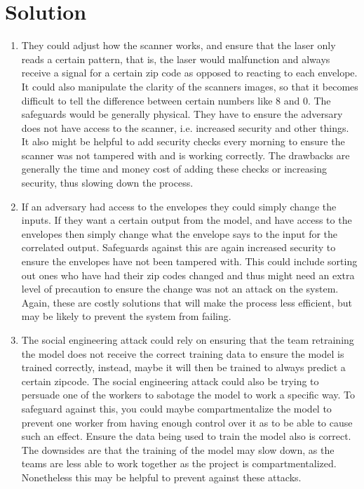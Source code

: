 \documentclass[submit]{harvardml}
\newenvironment{answer}
  {\section*{Solution}}
{}
\begin{document}
\begin{answer}
\begin{enumerate}
      \begin{enumerate}
        \item They could adjust how the scanner works, and ensure that the laser only reads a certain pattern, that is, the laser would malfunction and always receive a signal for a certain zip code as opposed to reacting to each envelope. It could also manipulate the clarity of the scanners images, so that it becomes difficult to tell the difference between certain numbers like 8 and 0. The safeguards would be generally physical. They have to ensure the adversary does not have access to the scanner, i.e. increased security and other things. It also might be helpful to add security checks every morning to ensure the scanner was not tampered with and is working correctly. The drawbacks are generally the time and money cost of adding these checks or increasing security, thus slowing down the process. 
        \item If an adversary had access to the envelopes they could simply change the inputs. If they want a certain output from the model, and have access to the envelopes then simply change what the envelope says to the input for the correlated output. Safeguards against this are again increased security to ensure the envelopes have not been tampered with. This could include sorting out ones who have had their zip codes changed and thus might need an extra level of precaution to ensure the change was not an attack on the system. Again, these are costly solutions that will make the process less efficient, but may be likely to prevent the system from failing. 
        \item The social engineering attack could rely on ensuring that the team retraining the model does not receive the correct training data to ensure the model is trained correctly, instead, maybe it will then be trained to always predict a certain zipcode. The social engineering attack could also be trying to persuade one of the workers to sabotage the model to work a specific way. To safeguard against this, you could maybe compartmentalize the model to prevent one worker from having enough control over it as to be able to cause such an effect. Ensure the data being used to train the model also is correct. The downsides are that the training of the model may slow down, as the teams are less able to work together as the project is compartmentalized. Nonetheless this may be helpful to prevent against these attacks. 


\end{enumerate}
\end{enumerate}
\end{answer}
\end{document}
